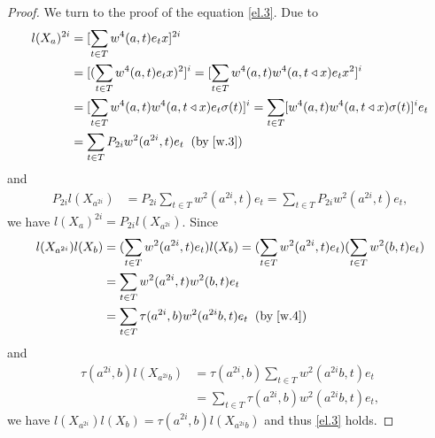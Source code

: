 \documentclass[a4paper,11pt]{amsart}
\numberwithin{equation}{section}
\begin{document}
\begin{proof}
We turn to the proof of the equation \eqref{el.3}. Due to
\begin{align*}
l(X_a)^{2i}&=[\sum\limits_{t \in T}w^4(a,t)e_t x]^{2i}\\
&=[(\sum\limits_{t \in T}w^4(a,t)e_t x)^2]^{i}=[\sum\limits_{t \in T}w^4(a,t) w^4(a,t\triangleleft x) e_t x^2]^{i}\\
&=[\sum\limits_{t \in T}w^4(a,t) w^4(a,t\triangleleft x) e_t \sigma(t)]^{i}=\sum\limits_{t \in T}[w^4(a,t) w^4(a,t\triangleleft x)\sigma(t)]^i e_t\\
&=\sum\limits_{t \in T} P_{2i}w^2(a^{2i},t)e_t \;\;(\text{by}\;\eqref{w.3})
\end{align*}
and
\begin{align*}
P_{2i}l(X_{a^{2i}})&=P_{2i}\sum\limits_{t \in T} w^2(a^{2i},t)e_t=\sum\limits_{t \in T} P_{2i}w^2(a^{2i},t)e_t,
\end{align*}
we have $l(X_a)^{2i}=P_{2i}l(X_{a^{2i}})$. Since
\begin{align*}
l(X_{a^{2i}})l(X_b)&=(\sum\limits_{t \in T}w^2(a^{2i},t)e_t) l(X_b)=(\sum\limits_{t \in T}w^2(a^{2i},t)e_t) (\sum\limits_{t \in T}w^2(b,t)e_t)\\
&=\sum\limits_{t \in T}w^2(a^{2i},t) w^2(b,t) e_t\\
&=\sum\limits_{t \in T}\tau(a^{2i},b) w^2(a^{2i}b,t) e_t \;\;(\text{by}\;\eqref{w.4})
\end{align*}
and
\begin{align*}
\tau(a^{2i},b) l(X_{a^{2i}b})&=\tau(a^{2i},b) \sum\limits_{t \in T}w^2(a^{2i}b,t) e_t\\
&=\sum\limits_{t \in T}\tau(a^{2i},b) w^2(a^{2i}b,t) e_t,
\end{align*}
we have $l(X_{a^{2i}})l(X_b)=\tau(a^{2i},b) l(X_{a^{2i}b})$ and thus \eqref{el.3} holds.


\end{proof}
\end{document}
